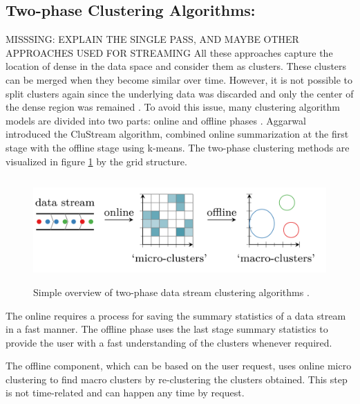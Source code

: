 \documentclass[../UNBThesis2.tex]{subfiles}
\begin{document}
\subsection{Two-phase Clustering Algorithms:}
MISSSING: EXPLAIN THE SINGLE PASS, AND MAYBE OTHER APPROACHES USED FOR STREAMING
All these approaches capture the location of dense in the data space and consider them as clusters. These clusters can be merged when they become similar over time. However, it is not possible to split clusters again since the underlying data was discarded and only the center of the dense region was remained \cite{aggarwal2007data}. To avoid this issue, many clustering algorithm models are divided into two parts: online and offline phases \cite{aggarwal2003framework}. Aggarwal introduced the CluStream algorithm, combined online summarization at the first stage with the offline stage using k-means. The two-phase clustering methods are visualized in figure \ref{2phase} by the grid structure.

\begin{figure}
\centering
\includegraphics[width = 15cm,height = 4cm]{image/Chapters/Chapter2/2phase.png}
\caption{Simple overview of two-phase data stream clustering algorithms \protect\cite{carnein2019optimizing}.}
\label{2phase}
\end{figure}

The online requires a process for saving the summary statistics of a data stream in a fast manner. The offline phase uses the last stage summary statistics to provide the user with a fast understanding of the clusters whenever required. 

The offline component, which can be based on the user request, uses online micro clustering to find macro clusters by re-clustering the clusters obtained. This step is not time-related and can happen any time by request. 


\end{document}
